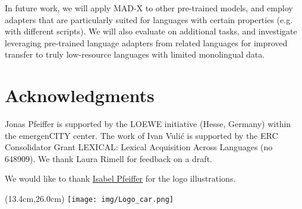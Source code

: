 \documentclass[11pt,a4paper]{article}
\newcommand{\model}[1]{\textsc{MAD-X}}
\begin{document}
 
In future work, we will apply \model{} to other pre-trained models, and employ adapters that are particularly suited for languages with certain properties (e.g. with different scripts). We will also evaluate on additional tasks, and investigate leveraging pre-trained language adapters from related languages for improved transfer to truly low-resource languages with limited monolingual data.

 

\section*{Acknowledgments}
Jonas Pfeiffer is supported by the LOEWE initiative (Hesse, Germany) within the emergenCITY center. The work of Ivan Vuli\'{c} is supported by the ERC Consolidator Grant LEXICAL: Lexical Acquisition Across Languages (no 648909). We thank Laura Rimell for feedback on a draft.

We would like to thank \href{https://instagram.com/isabelpfeiffer_art?igshid=165k7u2wz7pb0}{Isabel Pfeiffer} for the logo illustrations.

\begin{textblock*}{5cm}(13.4cm,26.0cm)  
\texttt{[image: img/Logo\_car.png]}
\end{textblock*}




\iffalse
\clearpage
\fi
\appendix
\appendix
\end{document}
